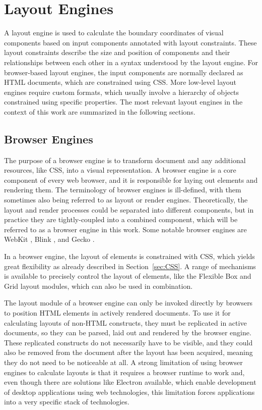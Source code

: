 \section{Layout Engines}
\label{sec:LayoutEngines}

A layout engine is used to calculate the boundary coordinates of
visual components based on input components annotated with layout
constraints. These layout constraints describe the size and position
of components and their relationships between each other in a syntax
understood by the layout engine. For browser-based layout engines, the
input components are normally declared as HTML documents, which are
constrained using CSS. More low-level layout engines require custom
formats, which usually involve a hierarchy of objects constrained
using specific properties. The most relevant layout engines in the
context of this work are summarized in the following sections.


\subsection{Browser Engines}
\label{sec:BrowserEngines}

The purpose of a browser engine is to transform document and any
additional resources, like CSS, into a visual representation. A
browser engine is a core component of every web browser, and it is
responsible for laying out elements and rendering them. The
terminology of browser engines is ill-defined, with them sometimes
also being referred to as layout or render engines. Theoretically, the
layout and render processes could be separated into different
components, but in practice they are tightly-coupled into a combined
component, which will be referred to as a browser engine in this work.
Some notable browser engines are WebKit \parencite{WebKit}, Blink
\parencite{Blink}, and Gecko \parencite{Gecko}.

In a browser engine, the layout of elements is constrained with CSS,
which yields great flexibility as already described in
Section~\ref{sec:CSS}. A range of mechanisms is available to precisely
control the layout of elements, like the Flexible Box and Grid layout
modules, which can also be used in combination.

The layout module of a browser engine can only be invoked directly by
browsers to position HTML elements in actively rendered documents. To
use it for calculating layouts of non-HTML constructs, they must be
replicated in active documents, so they can be parsed, laid out and
rendered by the browser engine. These replicated constructs do not
necessarily have to be visible, and they could also be removed from
the document after the layout has been acquired, meaning they do not
need to be noticeable at all. A strong limitation of using browser
engines to calculate layouts is that it requires a browser runtime to
work and, even though there are solutions like Electron
\parencite{Electron} available, which enable development of desktop
applications using web technologies, this limitation forces
applications into a very specific stack of technologies.



